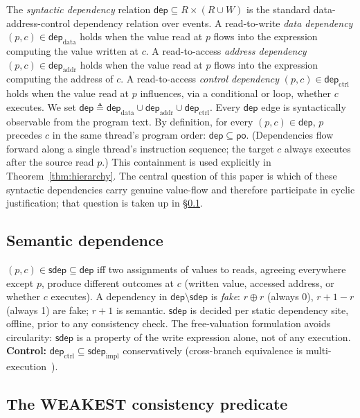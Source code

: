 \documentclass{llncs}
\newcommand{\sdep}{\mathsf{sdep}}
\newcommand{\dep}{\mathsf{dep}}
\newcommand{\po}{\mathsf{po}}
\newcommand{\sdepimpl}{\mathsf{sdep}_{\mathrm{impl}}}
\begin{document}
The \emph{syntactic dependency} relation $\dep \subseteq R \times (R \cup W)$
is the standard data-address-control dependency relation over events. A
read-to-write \emph{data dependency} $(p, c) \in \dep_{\mathrm{data}}$ holds
when the value read at $p$ flows into the expression computing the value
written at $c$. A read-to-access \emph{address dependency} $(p, c) \in
\dep_{\mathrm{addr}}$ holds when the value read at $p$ flows into the
expression computing the address of $c$. A read-to-access \emph{control
dependency} $(p, c) \in \dep_{\mathrm{ctrl}}$ holds when the value read at $p$
influences, via a conditional or loop, whether $c$ executes. We set $\dep \triangleq \dep_{\mathrm{data}} \cup \dep_{\mathrm{addr}} \cup
\dep_{\mathrm{ctrl}}$. Every $\dep$ edge is syntactically observable from the
program text. By definition, for every $(p, c) \in \dep$, $p$ precedes $c$ in
the same thread's program order: $\dep \subseteq \po$. (Dependencies flow
forward along a single thread's instruction sequence; the target $c$ always
executes after the source read $p$.) This containment is used explicitly in
Theorem~\ref{thm:hierarchy}. The central question of this paper is which of
these syntactic dependencies carry genuine value-flow and therefore participate
in cyclic justification; that question is taken up in \S\ref{sec:semdep}.

\subsection{Semantic dependence}
\label{sec:semdep}

$(p, c) \in \sdep \subseteq \dep$ iff two assignments of values to reads,
agreeing everywhere except $p$, produce different outcomes at $c$ (written
value, accessed address, or whether $c$ executes). A dependency in
$\dep \setminus \sdep$ is \emph{fake}: $r \oplus r$ (always 0),
$r{+}1{-}r$ (always 1) are fake; $r{+}1$ is semantic.
$\sdep$ is decided per static dependency site, offline, prior to any
consistency check. The free-valuation formulation avoids circularity:
$\sdep$ is a property of the write expression alone, not of any execution.
\textbf{Control:} $\dep_{\mathrm{ctrl}} \subseteq \sdepimpl$
conservatively (cross-branch equivalence is multi-execution~\cite{batty2015problem}).

\subsection{The WEAKEST consistency predicate}
\label{sec:weakest}
\end{document}
